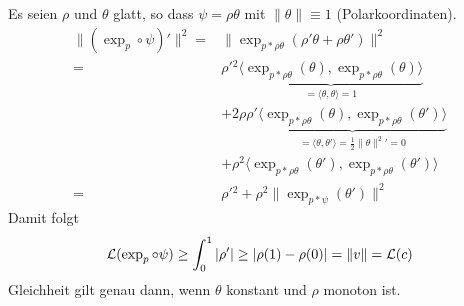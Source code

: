 \begin{bew}
  Es seien $\rho$ und $\theta$ glatt, so dass $\psi = \rho \theta$ mit $\|\theta\| \equiv 1$ (Polarkoordinaten).
  \begin{align*}
    \|(\exp_p \circ \psi)'\|^2 ={}& \|\exp_{p*\rho\theta} ( \rho' \theta + \rho \theta') \|^2 \\
    ={}& {\rho'}{^2} \underbrace{\langle \exp_{p*\rho\theta} (\theta), \exp_{p*\rho\theta} (\theta) \rangle}_{= \langle \theta, \theta \rangle = 1} \\
    & + 2\rho\rho' \underbrace{\langle \exp_{p*\rho\theta} (\theta), \exp_{p*\rho\theta} (\theta') \rangle}_{= \langle \theta, \theta' \rangle = \frac{1}{2} \|\theta\|^2{'} = 0} \\
    & + \rho^2 \langle \exp_{p*\rho\theta} (\theta'), \exp_{p*\rho\theta} (\theta') \rangle \\
    ={}& {\rho'}{^2} + \rho^2 \| \exp_{p*\psi}(\theta') \|^2
  \end{align*}
  Damit folgt
  \begin{align*}
    \calL(\exp_p \circ \psi) \ge \int_0^1 | \rho' | \ge | \rho(1) - \rho(0) | = \|v\| = \calL(c)
  \end{align*}
  Gleichheit gilt genau dann, wenn $\theta$ konstant und $\rho$ monoton ist.
\end{bew}

